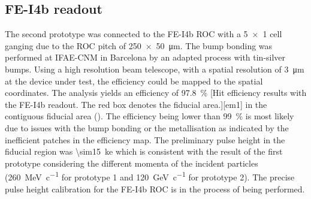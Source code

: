 \subsection{FE-I4b readout}
The second prototype was connected to the FE-I4b \ac{ROC} \cite{fei4} with a \SI{5x1}{} cell ganging due to the \ac{ROC} pitch of \SI{250x50}{\micro\meter}. The bump bonding was performed at IFAE-CNM in Barcelona by an adapted process with tin-silver bumps. Using a high resolution beam telescope,  with a spatial resolution of \SI{3}{\micro\meter} at the device under test, the efficiency could be mapped to the spatial coordinates. The analysis yields an efficiency of \SI{97.8}{\%} 
[Hit efficiency results with the FE-I4b readout. The red box denotes the fiducial area.][em1]
in the contiguous fiducial area (). The efficiency being lower than \SI{99}{\%} is most likely due to issues with the bump bonding or the metallisation as indicated by the inefficient patches in the efficiency map. The preliminary pulse height in the fiducial region was \SI{\sim15}{\kilo e} which is consistent with the result of the first prototype considering the different momenta of the incident particles (\SI{260}{\mega\electronvolt\per c} for prototype 1 and \SI{120}{\giga\electronvolt\per c} for prototype 2). The precise pulse height calibration for the FE-I4b \ac{ROC} is in the process of being performed.
